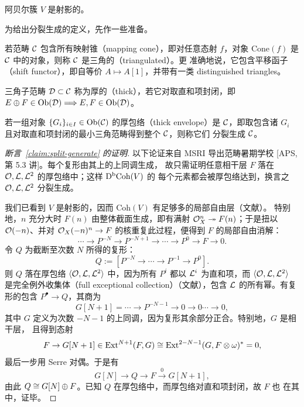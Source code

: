\begin{corollary}\label{cor:projective}
阿贝尔簇 $V$ 是射影的。
\end{corollary}

为给出分裂生成的定义，先作一些准备。

\begin{definition}\label{def:triangulated}
若范畴 $\mathcal{C}$ 包含所有映射锥（mapping cone），即对任意态射 $f$，对象
$\mathrm{Cone}(f)$ 是 $\mathcal{C}$ 中的对象，则称 $\mathcal{C}$ 是三角的（triangulated）。更
准确地说，它包含平移函子（shift functor），即自等价 $A\mapsto A[1]$，并带有一类
distinguished triangles。
\end{definition}

\begin{definition}\label{def:thick}
三角子范畴 $\mathcal{D}\subset\mathcal{C}$ 称为厚的（thick），若它对取直和项封闭，即
$E\oplus F\in\mathrm{Ob}(\mathcal{D})\Longrightarrow E,F\in\mathrm{Ob}(\mathcal{D})$。
\end{definition}

\begin{definition}\label{def:split-generate}
若一组对象 $\{G_i\}_{i\in I}\in\mathrm{Ob}(\mathcal{C})$ 的厚包络（thick envelope）是
$\mathcal{C}$，即取包含诸 $G_i$ 且对取直和项封闭的最小三角范畴得到整个 $\mathcal{C}$，则称它们
分裂生成 $\mathcal{C}$。
\end{definition}

\begin{proof}[断言~\ref{claim:split-generate} 的证明]
以下论证来自 MSRI 导出范畴暑期学校 [APS, 第 5.3 讲]。每个复形由其上的上同调生成，
故只需证明任意相干层 $F$ 落在 $\mathcal{O},\mathcal{L},\mathcal{L}^2$ 的厚包络中；这样 $\mathrm{D}^{\mathrm{b}}\mathrm{Coh}(V)$ 的
每个元素都会被厚包络达到，换言之 $\mathcal{O},\mathcal{L},\mathcal{L}^2$ 分裂生成。

我们已看到 $V$ 是射影的，因而 $\mathrm{Coh}(V)$ 有足够多的局部自由层（文献）。
特别地，$n$ 充分大时 $F(n)$ 由整体截面生成，即有满射
$\mathcal{O}_X^n\twoheadrightarrow F(n)$；于是扭以 $\mathcal{O}(-n)$、并对
$\mathcal{O}_X(-n)^n\to F$ 的核重复此过程，便得到 $F$ 的局部自由消解：
\[
\cdots\to P^{-N}\to P^{-N+1}\to\cdots\to P^0\to F\to0.
\]
令 $Q$ 为截断至次数 $N$ 所得的复形：
\[
Q:=[P^{-N}\to\cdots\to P^{-1}\to P^0].
\]
则 $Q$ 落在厚包络 $\langle\mathcal{O},\mathcal{L},\mathcal{L}^2\rangle$ 中，因为所有 $P^i$ 都以 $\mathcal{L}^i$
为直和项，而 $\langle\mathcal{O},\mathcal{L},\mathcal{L}^2\rangle$ 是完全例外收集体（full exceptional
collection）（文献），包含 $\mathcal{L}$ 的所有幂。有复形的包含 $P^\bullet\to Q$，其商为
\[
G[N+1]=\cdots\to P^{-N-1}\to0\to0\cdots\to0,
\]
其中 $G$ 定义为次数 $-N-1$ 的上同调，因为复形其余部分正合。特别地，$G$ 是相干层，
且得到态射
\[
F\to G[N+1]\in\mathrm{Ext}^{N+1}(F,G)\cong
\mathrm{Ext}^{2-N-1}(G,F\otimes\omega)^*=0,
\]
最后一步用 Serre 对偶。于是有
\[
G[N]\longrightarrow Q\longrightarrow F\xrightarrow{\ 0\ }G[N+1],
\]
由此 $Q\cong G[N]\oplus F$。已知 $Q$ 在厚包络中，而厚包络对直和项封闭，故 $F$ 也
在其中，证毕。
\end{proof}


